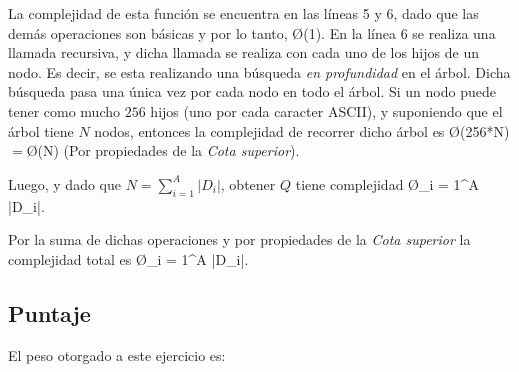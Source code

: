 La complejidad de esta función se encuentra en las líneas 5 y 6, dado que las demás operaciones son básicas y por lo tanto, \O(1).
En la línea 6 se realiza una llamada recursiva, y dicha llamada se realiza con cada uno de los hijos de un nodo. Es decir, se esta realizando una búsqueda \emph{en profundidad} en el árbol.
Dicha búsqueda pasa una única vez por cada nodo en todo el árbol. Si un nodo puede tener como mucho $256$ hijos (uno por cada caracter ASCII), y suponiendo que el árbol tiene $N$ nodos, entonces la complejidad de recorrer dicho árbol es \O(256*N)$ = $\O(N) (Por propiedades de la \emph{Cota superior}).

Luego, y dado que $N = \displaystyle \sum_{i = 1}^{A} |D_i|$, obtener $Q$ tiene complejidad \O{\displaystyle \sum_{i = 1}^{A} |D_i|}.

Por la suma de dichas operaciones y por propiedades de la \emph{Cota superior} la complejidad total es \O{\displaystyle \sum_{i = 1}^{A} |D_i|}.

\subsection{Puntaje}
El peso otorgado a este ejercicio es:
